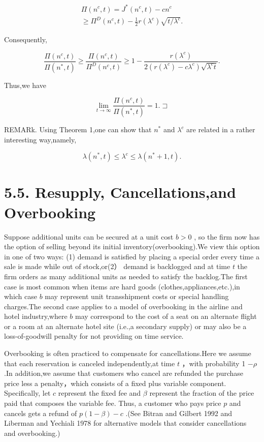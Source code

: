 \[
\begin{array} { l } { \displaystyle \Pi ( n ^ { c } , t ) = J ^ { * } ( n ^ { c } , t ) - c n ^ { c } } \\ { \displaystyle \ge \Pi ^ { D } ( n ^ { c } , t ) - \frac { 1 } { 2 } r ( \lambda ^ { c } ) \sqrt { t / \lambda ^ { c } } . } \end{array}
\]

Consequently,

\[
\frac { \Pi ( n ^ { c } , t ) } { \Pi ( n ^ { * } , t ) } \ge \frac { \Pi ( n ^ { c } , t ) } { \Pi ^ { D } ( n ^ { c } , t ) } \ge 1 - \frac { r ( \lambda ^ { c } ) } { 2 ( r ( \lambda ^ { c } ) - c \lambda ^ { c } ) \sqrt { \lambda ^ { c } t } } .
\]

Thus,we have

\[
\operatorname* { l i m } _ { t \to \infty } \frac { \Pi ( n ^ { c } , t ) } { \Pi ( n ^ { * } , t ) } = 1 . \sqsupset
\]

REMARk. Using Theorem 1,one can show that \(n ^ { * }\) and
\(\lambda ^ { c }\) are related in a rather interesting way,namely,

\[
{ \lambda } ( n ^ { * } , t ) \le { \lambda } ^ { c } \le { \lambda } ( n ^ { * } + 1 , t ) .
\]

\section{5.5. Resupply, Cancellations,and
Overbooking}\label{resupply-cancellationsand-overbooking}

Suppose additional units can be secured at a unit cost \(b > 0\) , so
the firm now has the option of selling beyond its initial
inventory(overbooking).We view this option in one of two ways: (1)
demand is satisfied by placing a special order every time a sale is made
while out of stock,or(2） demand is backlogged and at time \(t\) the
firm orders as many additional units as needed to satisfy the
backlog.The first case is most common when items are hard goods
(clothes,appliances,etc.),in which case \(b\) may represent unit
transshipment costs or special handling charges.The second case applies
to a model of overbooking in the airline and hotel industry,where \(b\)
may correspond to the cost of a seat on an alternate flight or a room at
an alternate hotel site (i.e.,a secondary supply) or may also be a
loss-of-goodwill penalty for not providing on time service.

Overbooking is often practiced to compensate for cancellations.Here we
assume that each reservation is canceled independently,at time \(t\)
，with probability 1 \(- \rho\) .In addition,we assume that customers
who cancel are refunded the purchase price less a penalty，which
consists of a fixed plus variable component. Specifically, let \(c\)
represent the fixed fee and \(\beta\) represent the fraction of the
price paid that composes the variable fee. Thus, a customer who pays
price \(p\) and cancels gets a refund of \(p ( 1 - \beta ) - c\) .(See
Bitran and Gilbert 1992 and Liberman and Yechiali 1978 for alternative
models that consider cancellations and overbooking.)

